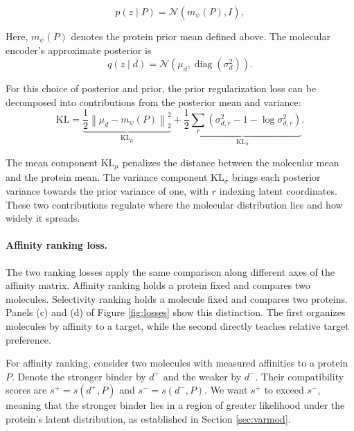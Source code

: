 \documentclass[a4paper,12pt]{article}
\begin{document}
\begin{equation*}
    p(z\mid P)
    =
    \mathcal{N}
    \left(
    m_\psi(P),I
    \right),
\end{equation*}

Here, $m_\psi(P)$ denotes the protein prior mean defined above. The molecular encoder's approximate posterior is
\begin{equation*}
    q(z\mid d)
    =
    \mathcal{N}
    \left(
    \mu_d,
    \operatorname{diag}(\sigma_d^2)
    \right).
\end{equation*}

For this choice of posterior and prior, the prior regularization loss can be decomposed into contributions from the posterior mean and variance:
\begin{equation*}
    \mathrm{KL}
    =\underbrace{
        \frac{1}{2}
        \left\|
        \mu_d-m_\psi(P)
        \right\|_2^2}_{\mathrm{KL}_{\mu}}+\underbrace{\frac{1}{2}
        \sum_r
        \left(
        \sigma_{d,r}^2
        -
        1
        -
        \log\sigma_{d,r}^2
        \right)}_{
        \mathrm{KL}_{\sigma}}.
\end{equation*}

The mean component $\mathrm{KL}_{\mu}$ penalizes the distance between the molecular mean and the protein mean. The variance component $\mathrm{KL}_{\sigma}$ brings each posterior variance towards the prior variance of one, with $r$ indexing latent coordinates. These two contributions regulate where the molecular distribution lies and how widely it spreads.
\paragraph{Affinity ranking loss.}
The two ranking losses apply the same comparison along different axes of the affinity matrix. Affinity ranking holds a protein fixed and compares two molecules. Selectivity ranking holds a molecule fixed and compares two proteins. Panels (c) and (d) of Figure \ref{fig:losses} show this distinction. The first organizes molecules by affinity to a target, while the second directly teaches relative target preference.

For affinity ranking, consider two molecules with measured affinities to a protein $P$. Denote the stronger binder by $d^{+}$ and the weaker by $d^{-}$. Their compatibility scores are $s^+=s(d^{+},P)$ and $s^-=s(d^{-},P)$. We want $s^+$ to exceed $s^-$, meaning that the stronger binder lies in a region of greater likelihood under the protein's latent distribution, as established in Section \ref{sec:varmod}.
\end{document}
